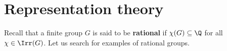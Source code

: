 \chapter{Representation theory}

Recall that a finite group $G$ is said to be \textbf{rational} if
$\chi(G)\subseteq\Q$ for all $\chi\in\Irr(G)$. Let us search for examples of
rational groups.

\begin{example}
\end{example}


\begin{example}
\end{example}











